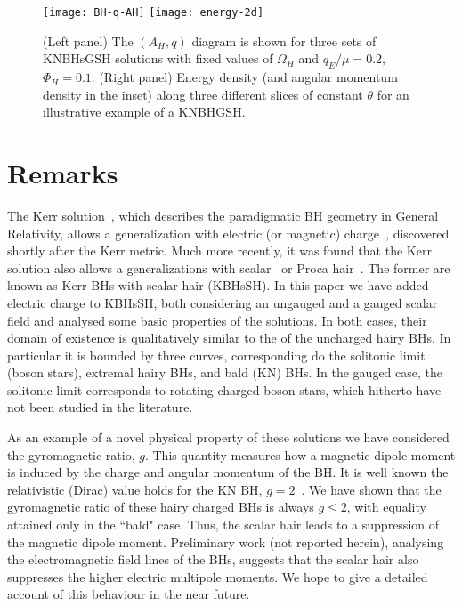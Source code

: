 \begin{figure}[H]
  \begin{center}
    \texttt{[image: BH-q-AH]} 
      \texttt{[image: energy-2d]} 
  \end{center}
  \caption{ (Left panel) 
	The $(A_H,q)$ diagram is shown for three sets of KNBHsGSH solutions with fixed values of 
$\Omega_H$ and 
$q_E/\mu=0.2$, 
$\Phi_H=0.1$. (Right panel) 
 Energy density (and angular momentum density in the inset) along three different slices of constant $\theta$ for an illustrative example of a KNBHGSH.
	}
  \label{fig:q-AH-gauged}
\end{figure}
 


\section{Remarks}
\label{sec_remarks}

The Kerr solution~\cite{Kerr:1963ud}, which describes the paradigmatic BH geometry in General Relativity, allows a generalization with electric (or magnetic) charge~\cite{Newman:1965my}, discovered shortly after the Kerr metric. Much more recently, it was found that the Kerr solution also allows a generalizations with scalar~\cite{Herdeiro:2014goa,Herdeiro:2015gia,Kleihaus:2015iea,Herdeiro:2015tia,Chodosh:2015oma} or Proca hair~\cite{Herdeiro:2016tmi}. The former are known as Kerr BHs with scalar hair (KBHsSH). In this paper we have added electric charge to KBHsSH, both considering an ungauged and a gauged scalar field and analysed some basic properties of the solutions. In both cases, their domain of existence is qualitatively similar to the of the uncharged hairy BHs. In particular it is bounded by three curves, corresponding do the solitonic limit (boson stars), extremal hairy BHs, and bald (KN) BHs. In the gauged case, the solitonic limit corresponds to rotating charged boson stars, which hitherto have not been studied in the literature. 

As an example of a novel physical property of these solutions we have considered the gyromagnetic ratio, $g$. This quantity measures how a magnetic dipole moment is induced by the charge and angular momentum of the BH. It is well known the relativistic (Dirac) value holds for the KN BH, $g=2$~\cite{Carter:1968rr}. We have shown that the gyromagnetic ratio of these hairy charged BHs is always $g\leqslant 2$, with equality attained only in the ``bald" case. Thus, the scalar hair leads to a suppression of the magnetic dipole moment. Preliminary work (not reported herein), analysing the electromagnetic field lines of the BHs, suggests that the scalar hair also suppresses the higher electric multipole moments. We hope to give a detailed account of this behaviour in the near future.




